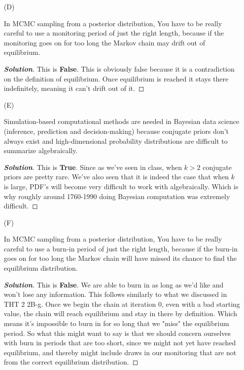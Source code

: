 \documentclass[12pt]{article}
\newenvironment{solution}{\begin{tcolorbox}[breakable]\begin{proof}[\textbf{\textit{Solution}}] }{\end{proof}\end{tcolorbox}}
\begin{document}
\begin{itemize}
\item[(D)]

In MCMC sampling from a posterior distribution, You have to be really careful to use a monitoring period of just the right length, because if the monitoring goes on for too long the Markov chain may drift out of equilibrium.

\begin{solution}
    This is \textbf{False}. This is obviously false because it is a contradiction on the definition of equilibrium. Once equilibrium is reached it stays there indefinitely, meaning it can't drift out of it. 
\end{solution}

\item[(E)]

Simulation-based computational methods are needed in Bayesian data science (inference, prediction and decision-making) because conjugate priors don't always exist and high-dimensional probability distributions are difficult to summarize algebraically.

\begin{solution}
    This is \textbf{True}. Since as we've seen in class, when $k > 2$ conjugate priors are pretty rare. We've also seen that it is indeed the case that when $k$ is large, PDF's will become very difficult to work with algebraically. Which is why roughly around 1760-1990 doing Bayesian computation was extremely difficult. 
\end{solution}

\item[(F)]

In MCMC sampling from a posterior distribution, You have to be really careful to use a burn-in period of just the right length, because if the burn-in goes on for too long the Markov chain will have missed its chance to find the equilibrium distribution.

\begin{solution}
    This is \textbf{False}. We are able to burn in as long as we'd like and won't lose any information. This follows similarly to what we discussed in THT 2 2B-g. Once we begin the chain at iteration 0, even with a bad starting value, the chain will reach equilibrium and stay in there by definition. Which means it's impossible to burn in for so long that we "miss" the equilibrium period. So what this might want to say is that we should concern ourselves with burn in periods that are too short, since we might not yet have reached equilibrium, and thereby might include draws in our monitoring that are not from the correct equilibrium distribution. 
\end{solution}


\end{itemize}
\end{document}
